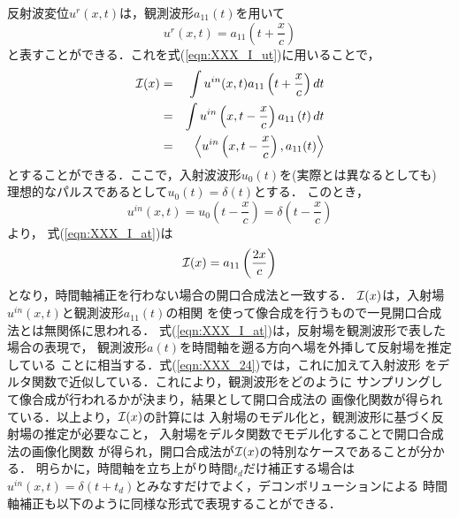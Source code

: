 反射波変位$u^{r}(x,t)$は，観測波形$a_{11}(t)$を用いて
\begin{equation}
	u^r(x,t)=a_{11}\left(t+\frac{x}{c}\right)
	\label{eqn:}
\end{equation}
と表すことができる．これを式(\ref{eqn:XXX_I_ut})に用いることで，
\begin{eqnarray}
	{\cal I}(x) &= & 
	\int u^{in}(x,t) a_{11}\left(t+\frac{x}{c}\right) dt
	\\
	&=&
	 \int u^{in}\left(x,t-\frac{x}{c}\right) a_{11}\left(t\right) dt \\
	&=&
	\left< u^{in}\left(x,t-\frac{x}{c}\right), a_{11}(t) \right>
	\label{eqn:XXX_I_at}
\end{eqnarray}
とすることができる．ここで，入射波波形$u_0(t)$を(実際とは異なるとしても)
理想的なパルスであるとして$u_0(t)=\delta(t)$とする．
このとき，
\begin{equation}
	u^{in}(x,t)=
	u_0\left(t-\frac{x}{c}\right)
	=
	\delta \left(t-\frac{x}{c}\right)
	\label{eqn:}
\end{equation}
より， 式(\ref{eqn:XXX_I_at})は
\begin{equation}
	{\cal I}(x)=a_{11}\left(\frac{2x}{c}\right)
	\label{eqn:XXX_24}
\end{equation}
となり，時間軸補正を行わない場合の開口合成法と一致する．
${\cal I}(x)$は，入射場$u^{in}(x,t)$と観測波形$a_{11}(t)$の相関
を使って像合成を行うもので一見開口合成法とは無関係に思われる．
式(\ref{eqn:XXX_I_at})は，反射場を観測波形で表した場合の表現で，
観測波形$a(t)$を時間軸を遡る方向へ場を外挿して反射場を推定している
ことに相当する．式(\ref{eqn:XXX_24})では，これに加えて入射波形
をデルタ関数で近似している．これにより，観測波形をどのように
サンプリングして像合成が行われるかが決まり，結果として開口合成法の
画像化関数が得られている．以上より，${\cal I}(x)$の計算には
入射場のモデル化と，観測波形に基づく反射場の推定が必要なこと，
入射場をデルタ関数でモデル化することで開口合成法の画像化関数
が得られ，開口合成法が${\cal I}(x)$の特別なケースであることが分かる．
%
%
%
明らかに，時間軸を立ち上がり時間$t_d$だけ補正する場合は
$u^{in}(x,t)=\delta(t+t_d)$とみなすだけでよく，デコンボリューションによる
時間軸補正も以下のように同様な形式で表現することができる．

